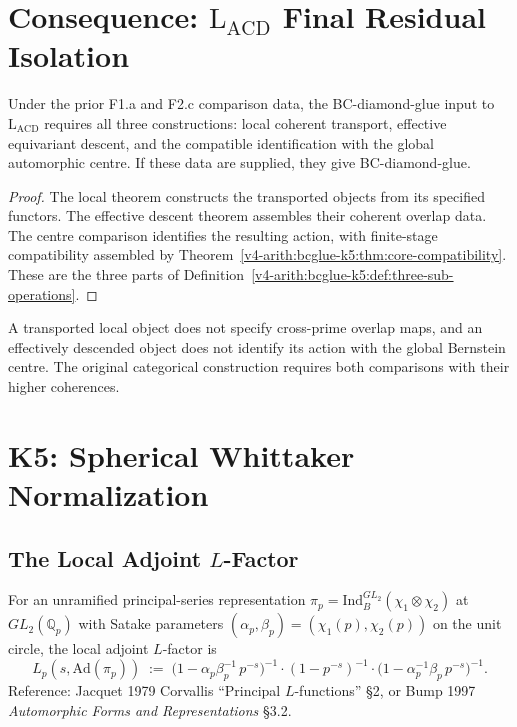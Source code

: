 \section{Consequence: \(\mathrm{L}_{\mathrm{ACD}}\) Final Residual Isolation}
\label{v4-arith:bcglue-k5:LACD-final}

\begin{corollary}
\label{v4-arith:bcglue-k5:cor:LACD-tight-list}
Under the prior F1.a and F2.c comparison data, the BC-diamond-glue
input to \(\mathrm L_{\mathrm{ACD}}\) requires all three constructions:
local coherent transport, effective equivariant descent, and the
compatible identification with the global automorphic centre.
If these data are supplied, they give BC-diamond-glue.
\end{corollary}
\begin{proof}
The local theorem constructs the transported objects from its
specified functors. The effective descent theorem assembles their
coherent overlap data. The centre comparison identifies the resulting
action, with finite-stage compatibility assembled by
Theorem~\ref{v4-arith:bcglue-k5:thm:core-compatibility}.
These are the three parts of
Definition~\ref{v4-arith:bcglue-k5:def:three-sub-operations}.
\end{proof}
\begin{remark}
\label{v4-arith:bcglue-k5:rem:domain-delta}
A transported local object does not specify cross-prime overlap
maps, and an effectively descended object does not identify its
action with the global Bernstein centre. The original categorical
construction requires both comparisons with their higher coherences.
\end{remark}

\section{K5: Spherical Whittaker Normalization}
\label{v4-arith:bcglue-k5:K5}

\subsection{The Local Adjoint \(L\)-Factor}

\begin{definition}
\label{v4-arith:bcglue-k5:def:adjoint-L}
For an unramified principal-series representation
\(\pi_{p}=\mathrm{Ind}_{B}^{GL_{2}}(\chi_{1}\otimes\chi_{2})\) at
\(GL_{2}(\mathbb{Q}_{p})\) with Satake parameters
\((\alpha_{p},\beta_{p})=(\chi_{1}(p),\chi_{2}(p))\) on the unit
circle, the local adjoint \(L\)-factor is
\begin{equation}
\label{v4-arith:bcglue-k5:eq:adjoint-L}
L_{p}(s,\mathrm{Ad}(\pi_{p}))
\;:=\;\bigl(1-\alpha_{p}\beta_{p}^{-1}\,p^{-s}\bigr)^{-1}
\cdot(1-p^{-s})^{-1}
\cdot\bigl(1-\alpha_{p}^{-1}\beta_{p}\,p^{-s}\bigr)^{-1}.
\end{equation}
Reference: Jacquet 1979 Corvallis ``Principal \(L\)-functions'' \S2,
or Bump 1997 \emph{Automorphic Forms and Representations} \S3.2.
\end{definition}

